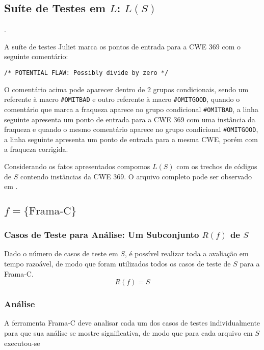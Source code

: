   \subsection{Suíte de Testes em $L$: $L(S)$}.

  A suíte de testes Juliet marca os pontos de entrada para a CWE 369 com o seguinte comentário:

  \lstinline{/* POTENTIAL FLAW: Possibly divide by zero */}

  O comentário acima pode aparecer dentro de 2 grupos condicionais, sendo um referente à macro \lstinline{#OMITBAD} e outro referente à macro \lstinline{#OMITGOOD}, quando o comentário que marca a fraqueza aparece no grupo condicional \lstinline{#OMITBAD}, a linha seguinte apresenta um ponto de entrada para a CWE 369 com uma instância da fraqueza e quando o mesmo comentário aparece no grupo condicional \lstinline{#OMITGOOD}, a linha seguinte apresenta um ponto de entrada para a mesma CWE, porém com a fraqueza corrigida.

  Considerando os fatos apresentados compomos $L(S)$ com os trechos de códigos de $S$ contendo instâncias da CWE 369. O arquivo completo pode ser observado em .

  \subsection{$f = \{\mbox{Frama-C}\}$}
  \subsubsection{Casos de Teste para Análise: Um Subconjunto $R(f)$ de $S$}

  Dado o número de casos de teste em $S$, é possível realizar toda a avaliação em tempo razoável, de modo que foram utilizados todos os casos de teste de $S$ para a Frama-C.
  \begin{equation}
    R(f) = S
  \end{equation}

  \subsubsection{Análise}

  A ferramenta Frama-C deve analisar cada um dos casos de testes individualmente para que sua análise se mostre significativa, de modo que para cada arquivo em $S$ executou-se

